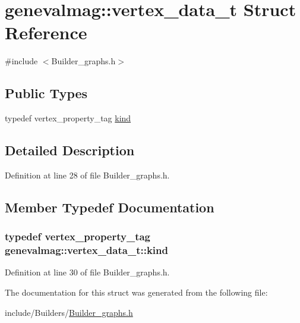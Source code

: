 \hypertarget{structgenevalmag_1_1vertex__data__t}{
\section{genevalmag::vertex\_\-data\_\-t Struct Reference}
\label{structgenevalmag_1_1vertex__data__t}
}


{\ttfamily \#include $<$Builder\_\-graphs.h$>$}

\subsection*{Public Types}
\begin{DoxyCompactItemize}
\item 
typedef vertex\_\-property\_\-tag \hyperlink{structgenevalmag_1_1vertex__data__t_aaa8911d9d8999d67da4cbfde01a247f8}{kind}
\end{DoxyCompactItemize}


\subsection{Detailed Description}


Definition at line 28 of file Builder\_\-graphs.h.



\subsection{Member Typedef Documentation}
\hypertarget{structgenevalmag_1_1vertex__data__t_aaa8911d9d8999d67da4cbfde01a247f8}{
\subsubsection[{kind}]{\setlength{\rightskip}{0pt plus 5cm}typedef vertex\_\-property\_\-tag {\bf genevalmag::vertex\_\-data\_\-t::kind}}}
\label{structgenevalmag_1_1vertex__data__t_aaa8911d9d8999d67da4cbfde01a247f8}


Definition at line 30 of file Builder\_\-graphs.h.



The documentation for this struct was generated from the following file:\begin{DoxyCompactItemize}
\item 
include/Builders/\hyperlink{Builder__graphs_8h}{Builder\_\-graphs.h}\end{DoxyCompactItemize}
